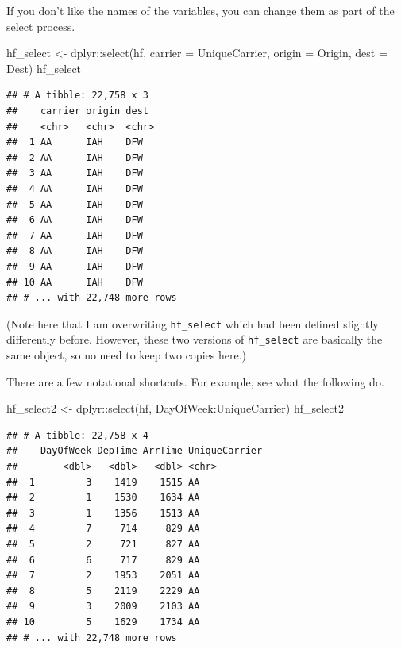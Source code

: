 \documentclass[
]{book}
\newenvironment{Shaded}{\begin{snugshade}}{\end{snugshade}}
\newcommand{\AttributeTok}[1]{\textcolor[rgb]{0.77,0.63,0.00}{#1}}
\newcommand{\FunctionTok}[1]{\textcolor[rgb]{0.00,0.00,0.00}{#1}}
\newcommand{\NormalTok}[1]{#1}
\newcommand{\OtherTok}[1]{\textcolor[rgb]{0.56,0.35,0.01}{#1}}
\newcommand{\SpecialCharTok}[1]{\textcolor[rgb]{0.00,0.00,0.00}{#1}}
\begin{document}
If you don't like the names of the variables, you can change them as part of the select process.

\begin{Shaded}
\begin{Highlighting}[]
\NormalTok{hf\_select }\OtherTok{\textless{}{-}}\NormalTok{ dplyr}\SpecialCharTok{::}\FunctionTok{select}\NormalTok{(hf,}
                           \AttributeTok{carrier =}\NormalTok{ UniqueCarrier,}
                           \AttributeTok{origin =}\NormalTok{ Origin,}
                           \AttributeTok{dest =}\NormalTok{ Dest)}
\NormalTok{hf\_select}
\end{Highlighting}
\end{Shaded}

\begin{verbatim}
## # A tibble: 22,758 x 3
##    carrier origin dest 
##    <chr>   <chr>  <chr>
##  1 AA      IAH    DFW  
##  2 AA      IAH    DFW  
##  3 AA      IAH    DFW  
##  4 AA      IAH    DFW  
##  5 AA      IAH    DFW  
##  6 AA      IAH    DFW  
##  7 AA      IAH    DFW  
##  8 AA      IAH    DFW  
##  9 AA      IAH    DFW  
## 10 AA      IAH    DFW  
## # ... with 22,748 more rows
\end{verbatim}

(Note here that I am overwriting \texttt{hf\_select} which had been defined slightly differently before. However, these two versions of \texttt{hf\_select} are basically the same object, so no need to keep two copies here.)

There are a few notational shortcuts. For example, see what the following do.

\begin{Shaded}
\begin{Highlighting}[]
\NormalTok{hf\_select2 }\OtherTok{\textless{}{-}}\NormalTok{ dplyr}\SpecialCharTok{::}\FunctionTok{select}\NormalTok{(hf, DayOfWeek}\SpecialCharTok{:}\NormalTok{UniqueCarrier)}
\NormalTok{hf\_select2}
\end{Highlighting}
\end{Shaded}

\begin{verbatim}
## # A tibble: 22,758 x 4
##    DayOfWeek DepTime ArrTime UniqueCarrier
##        <dbl>   <dbl>   <dbl> <chr>        
##  1         3    1419    1515 AA           
##  2         1    1530    1634 AA           
##  3         1    1356    1513 AA           
##  4         7     714     829 AA           
##  5         2     721     827 AA           
##  6         6     717     829 AA           
##  7         2    1953    2051 AA           
##  8         5    2119    2229 AA           
##  9         3    2009    2103 AA           
## 10         5    1629    1734 AA           
## # ... with 22,748 more rows
\end{verbatim}
\end{document}
